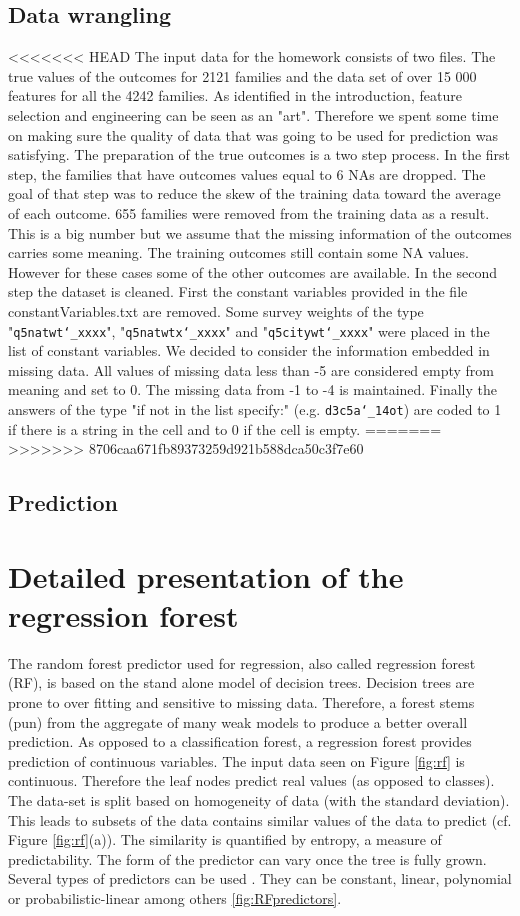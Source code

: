 \documentclass{article} %
\begin{document}
\subsection{Data wrangling}
<<<<<<< HEAD
The input data for the homework consists of two files. The true values of the outcomes for 2121 families and the data set of over 15 000 features for all the 4242 families. As identified in the introduction, feature selection and engineering can be seen as an "art". Therefore we spent some time on making sure the quality of data that was going to be used for prediction was satisfying. 
The preparation of the true outcomes is a two step process. In the first step, the families that have outcomes values equal to 6 NAs are dropped. The goal of that step was to reduce the skew of the training data toward the average of each outcome. 655 families were removed from the training data as a result. This is a big number but we assume that the missing information of the outcomes carries some meaning. The training outcomes still contain some NA values. However for these cases some of the other outcomes are available. In the second step the dataset is cleaned. First the constant variables provided in the file {\selectfont constantVariables.txt} are removed. Some survey weights of the type "\texttt{q5natwt\char`_xxxx}", "\texttt{q5natwtx\char`_xxxx}" and "\texttt{q5citywt\char`_xxxx}" were placed in the list of constant variables. We decided to consider the information embedded in missing data. All values of missing data less than -5 are considered empty from meaning and set to 0. The missing data from -1 to -4 is maintained. Finally the answers of the type "if not in the list specify:" (e.g. \texttt{d3c5a\char`_14ot}) are coded to 1 if there is a string in the cell and to 0 if the cell is empty.
=======
>>>>>>> 8706caa671fb89373259d921b588dca50c3f7e60
\subsection{Prediction}
\section{Detailed presentation of the regression forest}
The random forest predictor used for regression, also called regression forest (RF), is based on the stand alone model of decision trees. Decision trees are prone to over fitting and sensitive to missing data. Therefore, a forest stems (pun) from the aggregate of many weak models to produce a better overall prediction. As opposed to a classification forest, a regression forest provides prediction of continuous variables. The input data seen on Figure \ref{fig:rf} is continuous. Therefore the leaf nodes predict real values (as opposed to classes). The data-set is split based on homogeneity of data (with the standard deviation). This leads to subsets of the data contains similar values of the data to predict (cf. Figure \ref{fig:rf}(a)). The similarity is quantified by entropy, a measure of predictability. The form of the predictor can vary once the tree is fully grown. Several types of predictors can be used \cite{criminisi2011decision}. They can be constant, linear, polynomial or probabilistic-linear among others  \ref{fig:RFpredictors}.
\end{document}
